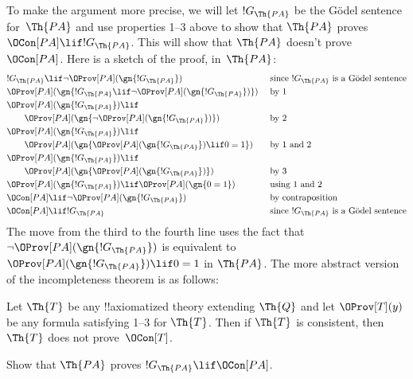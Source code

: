 \documentclass[../../../include/open-logic-section]{subfiles}
\begin{document}
To make the argument more precise, we will let $!G_\Th{PA}$ be the
G\"odel sentence for~$\Th{PA}$ and use properties 1--3 above to show
that $\Th{PA}$ proves $\OCon[PA] \lif !G_\Th{PA}$. This will show that
$\Th{PA}$ doesn't prove $\OCon[PA]$. Here is a sketch of the proof,
in~$\Th{PA}$:
\begin{align*}
& !G_\Th{PA} \lif \lnot \OProv[PA](\gn{!G_\Th{PA}}) &\ & 
  \text{since $!G_\Th{PA}$ is a G\"odel  sentence} \\
& \OProv[PA](\gn{!G_\Th{PA} \lif \lnot \OProv[PA](\gn{!G_\Th{PA}})}) && 
   \text{by 1} \\
& \OProv[PA](\gn{!G_\Th{PA}}) \lif \\
& \qquad \OProv[PA](\gn{\lnot \OProv[PA](\gn{!G_\Th{PA}})}) &&
   \text{by 2} \\
& \OProv[PA](\gn{!G_\Th{PA}}) \lif \\
& \qquad \OProv[PA](\gn{\OProv[PA](\gn{!G_\Th{PA}}) \lif 0 = 1}) &&
   \text{by 1 and 2} \\
& \OProv[PA](\gn{!G_\Th{PA}}) \lif \\
& \qquad \OProv[PA](\gn{\OProv[PA](\gn{!G_\Th{PA}})}) &&
   \text{by 3} \\
& \OProv[PA](\gn{!G_\Th{PA}}) \lif \OProv[PA](\gn{0=1}) &&
   \text{using 1 and 2} \\
& \OCon[PA] \lif \lnot \OProv[PA](\gn{!G_\Th{PA}}) &&
   \text{by contraposition} \\
& \OCon[PA] \lif !G_\Th{PA} &&
   \text{since $!G_\Th{PA}$ is a G\"odel sentence}
\end{align*}
The move from the third to the fourth line uses the fact that $\lnot
\OProv[PA](\gn{!G_\Th{PA}})$ is equivalent to
$\OProv[PA](\gn{!G_\Th{PA}}) \lif 0 = 1$ in $\Th{PA}$. The more
abstract version of the incompleteness theorem is as follows:

\begin{thm}
Let $\Th{T}$ be any !!{axiomatized} theory extending $\Th{Q}$ and let
$\OProv[T](y)$ be any formula satisfying 1--3 for $\Th{T}$. Then if
$\Th{T}$ is consistent, then $\Th{T}$ does not prove~$\OCon[T]$.
\end{thm}

\begin{prob}
Show that $\Th{PA}$ proves $!G_{\Th{PA}} \lif \OCon[PA]$.
\end{prob}
\end{document}
